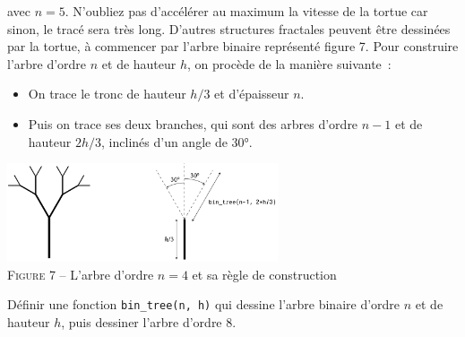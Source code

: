 \documentclass{magnoliaold}
\begin{document}
\begin{questions}
  avec $n=5$. N'oubliez pas d'accélérer au maximum la vitesse de la tortue car sinon, le tracé sera très long.
\enonce D'autres structures fractales peuvent être dessinées par la tortue, à commencer par l'arbre binaire
  représenté figure 7. Pour construire l'arbre d'ordre $n$ et de hauteur $h$, on procède de la manière
  suivante~:
  \begin{itemize}
  \item On trace le tronc de hauteur $h/3$ et d'épaisseur $n$.
  \item Puis on trace ses deux branches, qui sont des arbres d'ordre $n-1$ et de hauteur $2h/3$, inclinés
    d'un angle de \ang{30}.
  \end{itemize}
\begin{center}
\includegraphics[width=0.6\textwidth]{../../commun/images/python-tp-logo-7}\\
\textsc{Figure 7} -- L'arbre d'ordre $n=4$ et sa règle de construction
\end{center}
\question Définir une fonction \verb!bin_tree(n, h)! qui dessine l'arbre binaire d'ordre $n$ et de hauteur $h$,
  puis dessiner l'arbre d'ordre 8.
\end{questions}




\end{document}

